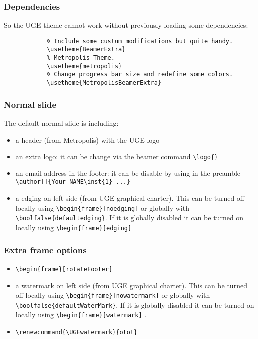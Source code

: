	\begin{frame}[fragile]
		\frametitle{Dependencies}

		So the UGE theme cannot work without previously loading some dependencies:
		\begin{verbatim}
			% Include some custum modifications but quite handy.
			\usetheme{BeamerExtra}
			% Metropolis Theme.
			\usetheme{metropolis}
			% Change progress bar size and redefine some colors.
			\usetheme{MetropolisBeamerExtra}
		\end{verbatim}
	\end{frame}


	\begin{frame}
		\frametitle{Normal slide}

		The default normal slide is including:
		\begin{itemize}
			\item a header (from Metropolis) with the UGE logo
			\item an extra logo: it can be change via the beamer command \verb|\logo{}|
			\item an email address in the footer: it can be disable by using in the preamble 
				\verb|\author[]{Your NAME\inst{1} ...}|
			\item a edging on left side (from UGE graphical charter). This can be turned off locally using \verb|\begin{frame}[noedging]| or globally with \verb|\boolfalse{defaultedging}|. If it is globally disabled it can be turned on locally using \verb|\begin{frame}[edging]|
		\end{itemize}
	\end{frame}


	\begin{frame}
		\frametitle{Extra frame options}

		\begin{itemize}
			\item \verb|\begin{frame}[rotateFooter]|
			\item a watermark on left side (from UGE graphical charter). This can be turned off locally using \verb|\begin{frame}[nowatermark]| or globally with \verb|\boolfalse{defaultWaterMark}|. If it is globally disabled it can be turned on locally using \verb|\begin{frame}[watermark]| .
			\item \verb|\renewcommand{\UGEwatermark}{otot}|
		\end{itemize}
	\end{frame}


